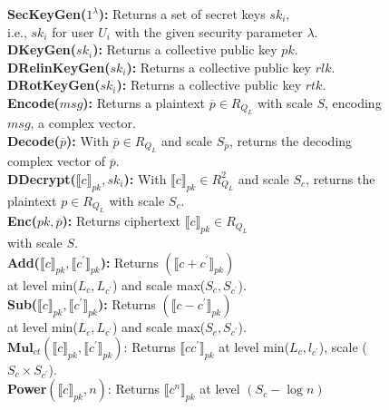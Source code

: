 \begin{figure}[!htb]
	\begin{framed}
		\noindent \textbf{SecKeyGen($1^\lambda$):} Returns a set of secret keys ${sk_i}$,\\
		i.e., $sk_i$ for user $U_i$ with the given security parameter $\lambda$.\\
		\noindent \textbf{DKeyGen(${sk_i}$):} Returns a collective public key $pk$.\\
		\noindent \textbf{DRelinKeyGen(${sk_i}$):} Returns a collective public key $rlk$.\\
		\noindent \textbf{DRotKeyGen(${sk_i}$):} Returns a collective public key $rtk$.\\
		\noindent \textbf{Encode($msg$):} Returns a plaintext $\overline{p}\in R_{Q_{L}}$ with scale $S$, encoding $msg$, a complex vector.\\
		\noindent \textbf{Decode($\overline{p}$):} With $\overline{p}\in R_{Q_{L}}$ and scale $S_{\overline{p}}$, returns the decoding complex vector of $\overline{p}$.\\
		\noindent \textbf{DDecrypt($\llbracket c\rrbracket_{pk}, {sk_i}$):} With $\llbracket c\rrbracket_{pk}\in R^2_{Q_{L}}$ and scale $S_c$, returns the plaintext $p\in R_{Q_{L}}$ with scale $S_c$.\\
		\noindent \textbf{Enc($pk, \overline{p}$):} Returns ciphertext $\llbracket c\rrbracket_{pk}\in R_{Q_{L}}$ \\
		with scale $S$.\\
		\noindent \textbf{Add($\llbracket c\rrbracket_{pk}, \llbracket c^{\prime}\rrbracket_{pk}$):} Returns $(\llbracket c+c^{\prime}\rrbracket_{pk})$ \\
		at level min($L_c, L_{c^{\prime}}$) and scale max($S_c, S_{c^{\prime}}$).\\
		\noindent \textbf{Sub($\llbracket c\rrbracket_{pk}, \llbracket c^{\prime}\rrbracket_{pk}$):} Returns $(\llbracket c-c^{\prime}\rrbracket_{pk})$ \\
		at level min($L_c, L_{c^{\prime}}$) and scale max($S_c, S_{c^{\prime}}$).\\
		\noindent $\textbf{Mul}_{ct}$$(\llbracket c\rrbracket_{pk}, \llbracket c^{\prime}\rrbracket_{pk})$: Returns $\llbracket cc^{\prime}\rrbracket_{pk}$ at level min($L_c, l_{c^{\prime}}$), scale ($S_c\times S_{c^{\prime}}$).\\
		\noindent \textbf{Power}$(\llbracket c\rrbracket_{pk}, n)$: Returns $\llbracket c^{n}\rrbracket_{pk}$ at level $(S_c-\log{n})$\\
$$
\end{framed}
\end{figure}
